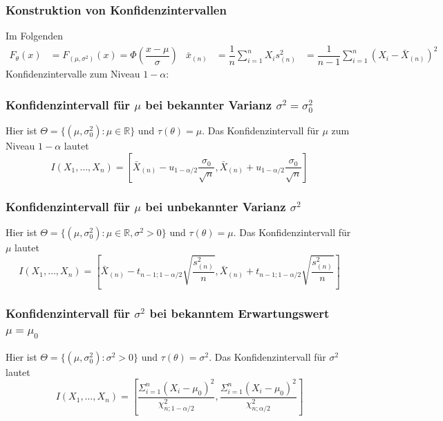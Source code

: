\documentclass[
	ngerman,
	accentcolor=9c,%
	type=intern,
	marginpar=false
	]{tudapub}
\begin{document}
            \subsubsection{Konstruktion von Konfidenzintervallen}
                Im Folgenden
                \begin{align*}
                    F_\theta(x) &= F_{(\mu, \sigma^2)}(x)= \Phi(\dfrac{x-\mu}{\sigma}) &
                    \bar{x}_{(n)}&=\dfrac{1}{n}\sum_{i=1}^n X_i
                    s^2_{(n)} &= \dfrac{1}{n-1}\sum_{i=1}^n (X_i - \bar{X}_{(n)})^2
                \end{align*}
                Konfidenzintervalle zum Niveau $1-\alpha$:
                \subsubsection*{Konfidenzintervall für $\mu$ bei bekannter Varianz $\sigma^2 = \sigma_0^2$}
                    Hier ist $\Theta = \{(\mu, \sigma^2_0):\mu \in \mathbb{R}\}$ und $\tau(\theta) = \mu$. Das Konfidenzintervall für $\mu$ zum Niveau $1-\alpha$ lautet
                    \begin{equation*}
                        I(X_1,\dots,X_n)=\left[\bar{X}_{(n)}-u_{1-\alpha/2}\dfrac{\sigma_0}{\sqrt{n}},\bar{X}_{(n)}+u_{1-\alpha/2}\dfrac{\sigma_0}{\sqrt{n}}\right]
                    \end{equation*}

                \subsubsection*{Konfidenzintervall für $\mu$ bei unbekannter Varianz $\sigma^2$}
                    Hier ist $\Theta = \{(\mu, \sigma^2_0):\mu \in \mathbb{R}, \sigma^2 > 0\}$ und $\tau(\theta) = \mu$. Das Konfidenzintervall für $\mu$ lautet
                    \begin{equation*}
                        I(X_1,\dots,X_n)=\left[\bar{X}_{(n)}-t_{n-1;1-\alpha/2}\sqrt{\dfrac{s^2_{(n)}}{n}},\bar{X}_{(n)}+t_{n-1;1-\alpha/2}\sqrt{\dfrac{s^2_{(n)}}{n}}\right]
                    \end{equation*}
                \subsubsection*{Konfidenzintervall für $\sigma^2$ bei bekanntem Erwartungswert $\mu = \mu_0$}
                    Hier ist $\Theta = \{(\mu, \sigma^2_0):\sigma^2 > 0\}$ und $\tau(\theta) = \sigma^2$. Das Konfidenzintervall für $\sigma^2$ lautet
                    \begin{equation*}
                        I(X_1,\dots,X_n)=\left[
                            \dfrac{\Sigma_{i=1}^n (X_i-\mu_0)^2}{\chi^2_{n;1-\alpha/2}}
                            ,
                            \dfrac{\Sigma_{i=1}^n (X_i-\mu_0)^2}{\chi^2_{n;\alpha/2}}
                        \right]
                    \end{equation*}
\end{document}
